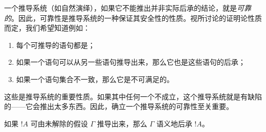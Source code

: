 \documentclass[../../../include/open-logic-section]{subfiles}
\begin{document}
      {}
      {}


\begin{explain}
一个推导系统（如自然演绎），如果它不能推出并非实际后承的结论，就是\emph{可靠的}。因此，可靠性是推导系统的一种保证其安全性的性质。视所讨论的证明论性质而定，我们希望知道例如：
\begin{enumerate}
\item 每个可推导的语句都是；
\item 如果一个语句可以从另一些语句推导出来，那么它也是这些语句的后承；
\item 如果一个语句集合不一致，那么它是不可满足的。
\end{enumerate}
这些是推导系统的重要性质。如果其中任何一个不成立，这个推导系统就是有缺陷的——它会推出太多东西。因此，确立一个推导系统的可靠性至关重要。
\end{explain}

\begin{thm}[可靠性]
如果 $!A$ 可由未解除的假设 $\Gamma$ 推导出来，那么 $\Gamma$ 语义地后承 $!A$。
\end{thm}
\end{document}
